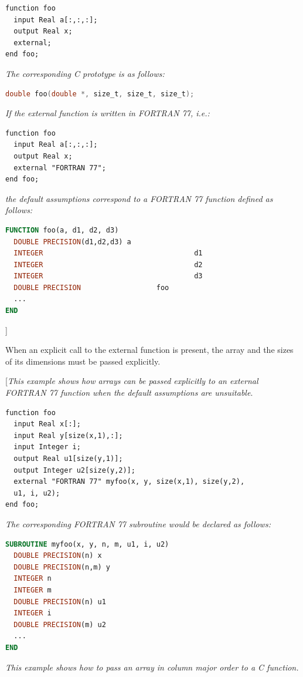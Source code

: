 \documentclass[10pt,a4paper]{report}
\begin{document}
\begin{lstlisting}[language=modelica]
function foo
  input Real a[:,:,:];
  output Real x;
  external;
end foo;
\end{lstlisting}
\emph{The corresponding C prototype is as follows:}
\begin{lstlisting}[language=C]
double foo(double *, size_t, size_t, size_t);
\end{lstlisting}

\emph{If the external function is written in FORTRAN 77, i.e.:}

\begin{lstlisting}[language=modelica]
function foo
  input Real a[:,:,:];
  output Real x;
  external "FORTRAN 77";
end foo;
\end{lstlisting}
\emph{the default assumptions correspond to a FORTRAN 77 function
defined as follows:}
\begin{lstlisting}[language=fortran]
FUNCTION foo(a, d1, d2, d3)
  DOUBLE PRECISION(d1,d2,d3) a
  INTEGER                                    d1
  INTEGER                                    d2
  INTEGER                                    d3
  DOUBLE PRECISION                  foo
  ...
END
\end{lstlisting}
{]}

When an explicit call to the external function is present, the array and
the sizes of its dimensions must be passed explicitly.

{[}\emph{This example shows how arrays can be passed explicitly to an
external FORTRAN 77 function when the default assumptions are
unsuitable}.

\begin{lstlisting}[language=modelica]
function foo
  input Real x[:];
  input Real y[size(x,1),:];
  input Integer i;
  output Real u1[size(y,1)];
  output Integer u2[size(y,2)];
  external "FORTRAN 77" myfoo(x, y, size(x,1), size(y,2),
  u1, i, u2);
end foo;
\end{lstlisting}
\emph{The corresponding FORTRAN 77 subroutine would be declared as
follows: }
\begin{lstlisting}[language=fortran]
SUBROUTINE myfoo(x, y, n, m, u1, i, u2)
  DOUBLE PRECISION(n) x
  DOUBLE PRECISION(n,m) y
  INTEGER n
  INTEGER m
  DOUBLE PRECISION(n) u1
  INTEGER i
  DOUBLE PRECISION(m) u2
  ...
END
\end{lstlisting}

\emph{This example shows how to pass an array in column major order to a
C function.}
\end{document}
